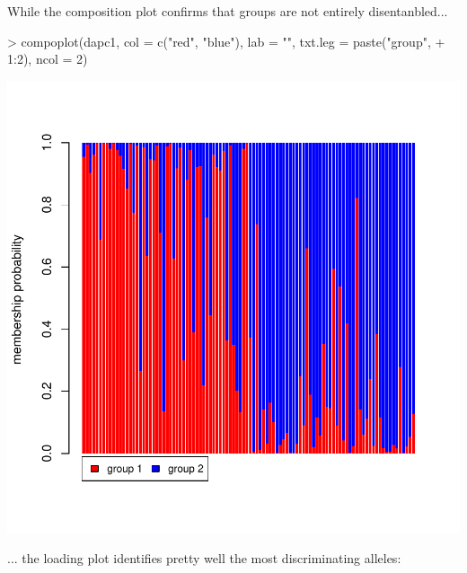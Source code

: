 \documentclass{article}
\begin{document}
\noindent While the composition plot confirms that groups are not entirely disentanbled...
\begin{Schunk}
\begin{Sinput}
> compoplot(dapc1, col = c("red", "blue"), lab = "", txt.leg = paste("group", 
+     1:2), ncol = 2)
\end{Sinput}
\end{Schunk}
\includegraphics{figs/genomics-063}

\noindent ... the loading plot identifies pretty well the most discriminating alleles:
\begin{Schunk}
\end{Schunk}
\end{document}
